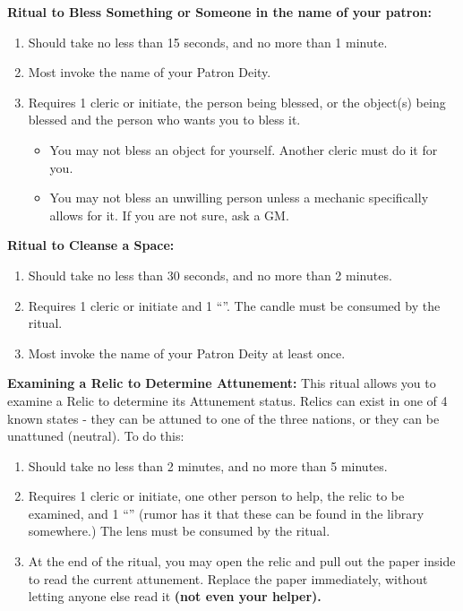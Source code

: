 \documentclass[green]{GL2020}
\begin{document}
\textbf{Ritual to Bless Something or Someone in the name of your patron:}
  \begin{enumerate}
    \item Should take no less than 15 seconds, and no more than 1 minute.
    \item Most invoke the name of your Patron Deity.
    \item Requires 1 cleric or initiate, the person being blessed, or the object(s) being blessed and the person who wants you to bless it. 
    \begin{itemize}
      \item You may not bless an object for yourself. Another cleric must do it for you.
      \item You may not bless an unwilling person unless a mechanic specifically allows for it. If you are not sure, ask a GM.
    \end{itemize}
  \end{enumerate}

\textbf{Ritual to Cleanse a Space:}
  \begin{enumerate}
    \item Should take no less than 30 seconds, and no more than 2 minutes.
    \item Requires 1 cleric or initiate and 1 ``\iRitualCandle{}''. The candle must be consumed by the ritual.
    \item Most invoke the name of your Patron Deity at least once.
  \end{enumerate}
   
\textbf{Examining a Relic to Determine Attunement:}
This ritual allows you to examine a Relic to determine its Attunement status. Relics can exist in one of 4 known states - they can be attuned to one of the three nations, or they can be unattuned (neutral). To do this:
  \begin{enumerate}
    \item Should take no less than 2 minutes, and no more than 5 minutes.
    \item Requires 1 cleric or initiate, one other person to help, the relic to be examined, and 1 ``\iCrystalLens{}'' (rumor has it that these can be found in the library somewhere.) The lens must be consumed by the ritual. 
    \item At the end of the ritual, you may open the relic and pull out the paper inside to read the current attunement. Replace the paper immediately, without letting anyone else read it \textbf{(not even your helper).}
  \end{enumerate}
   
\end{document}
